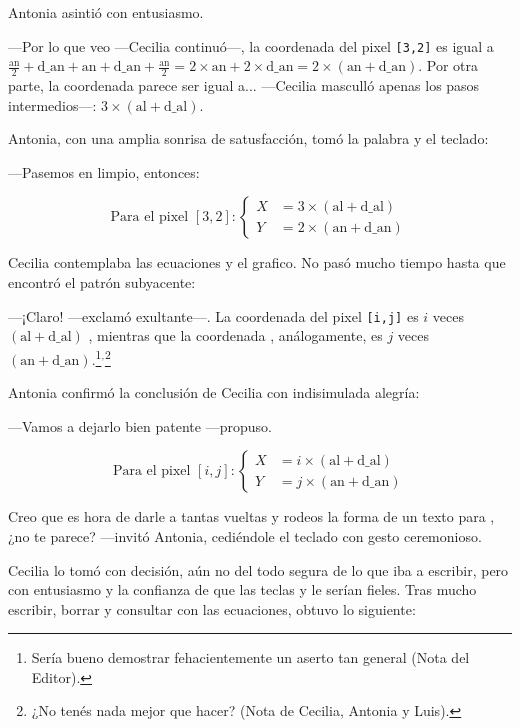 Antonia asintió con entusiasmo.

---Por lo que veo ---Cecilia continuó---, la coordenada  del
pixel \texttt{[3,2]} es igual a
$\frac{\text{an}}{2}+\text{d\_an}+\text{an}+\text{d\_an}+\frac{\text{an}}{2}=2\times
\text{an} + 2\times\text{d\_an}=2\times(\text{an}+\text{d\_an})$. Por
otra parte, la coordenada  parece ser igual a... ---Cecilia
masculló apenas los pasos intermedios---:
$3\times(\text{al}+\text{d\_al})$.

Antonia, con una amplia sonrisa de satusfacción, tomó la palabra y el
teclado:

---Pasemos en limpio, entonces:

\[
  \text{Para el pixel }[3,2]: \left\{
    \begin{aligned}
      X&=3\times(\text{al}+\text{d\_al})\\
      Y&=2\times(\text{an}+\text{d\_an})
    \end{aligned}
  \right.
\]

Cecilia contemplaba las ecuaciones y el grafico. No pasó mucho tiempo
hasta que encontró el patrón subyacente:

---¡Claro! ---exclamó exultante---. La coordenada  del pixel
\texttt{[i,j]} es $i$ veces $(\text{al}+\text{d\_al})$ , mientras que
la coordenada , análogamente, es $j$ veces
$(\text{an}+\text{d\_an})$.\footnote{Sería bueno demostrar
  fehacientemente un aserto tan general (Nota del
  Editor).}$^,$\footnote{¿No tenés nada mejor que hacer?  (Nota de
  Cecilia, Antonia y Luis).}

Antonia confirmó la conclusión de Cecilia con indisimulada alegría:

---Vamos a dejarlo bien patente ---propuso.


\begin{equation}
  \text{Para el pixel }[i,j]: \left\{
    \begin{aligned}
      X&=i\times(\text{al}+\text{d\_al})\\
      Y&=j\times(\text{an}+\text{d\_an})
    \end{aligned}
  \right.\label{eq:coordenadas-matriz}
\end{equation}

\guillemotright Creo que es hora de darle a tantas vueltas y rodeos la
forma de un texto para \openscad{}, ¿no te parece? ---invitó Antonia,
cediéndole el teclado con gesto ceremonioso.

Cecilia lo tomó con decisión, aún no del todo segura de lo que iba a
escribir, pero con entusiasmo y la confianza de que las teclas
 y \keystroke{$\Longleftarrow$} le serían fieles. Tras
mucho escribir, borrar y consultar con las ecuaciones, obtuvo lo
siguiente:

